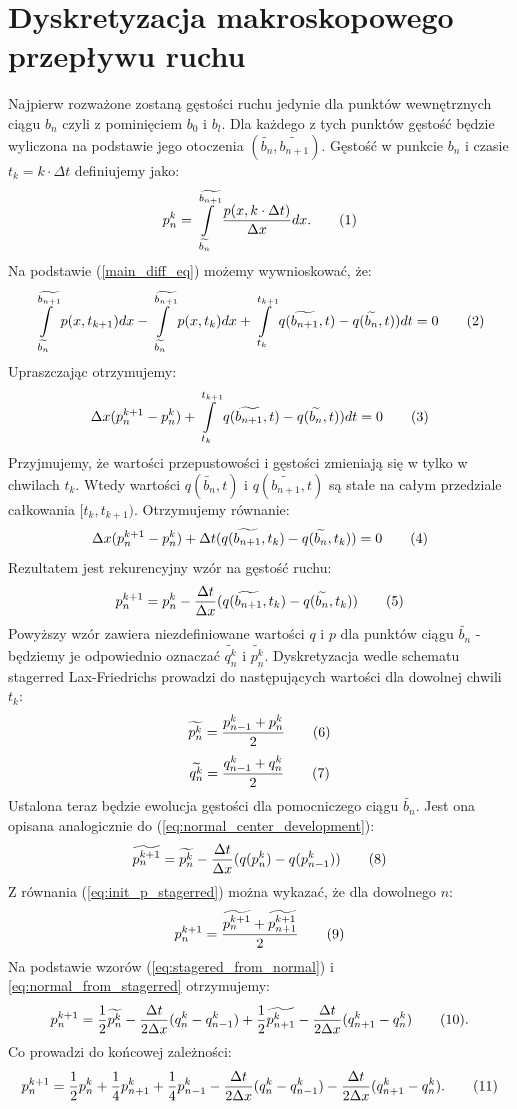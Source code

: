 \documentclass[12pt]{book}
\newcommand\addtag{\refstepcounter{equation}\tag{\theequation}}
\begin{document}
\section{Dyskretyzacja makroskopowego przepływu ruchu}\label{sec:dyskretyzacja_ruchu}
Najpierw rozważone zostaną gęstości ruchu jedynie dla punktów wewnętrznych ciągu $b_n$ czyli z pominięciem $b_0$ i $b_l$.
Dla każdego z tych punktów gęstość będzie wyliczona na podstawie jego otoczenia $(\widetilde{b_{n}},\widetilde{b_{n+1}})$. Gęstość w punkcie $b_n$ i czasie $t_k=k\cdot \Delta t$ definiujemy jako:
\[p_{n}^{k}=\int\limits_{{\widetilde{b_{n}}}}^{{\widetilde{b_{n+1}}}} {\frac{p(x,k \cdot \Delta t)}{\Delta x}dx}. \addtag\]
 Na podstawie (\ref{main_diff_eq}) możemy wywnioskować, że:
\[\int\limits_{\widetilde{b_{n}}}^{\widetilde{b_{n+1}}} {p(x,t_{k+1})dx-\int\limits_{\widetilde{b_{n}}}^{\widetilde{b_{n+1}}}p(x,t_{k})dx} +\int\limits_{t_k}^{t_{k+1}} q(\widetilde{b_{n+1}},t)-q(\widetilde{b_{n}},t))dt=0 \addtag \label{eq:calki-LWR} \]
Upraszczając otrzymujemy:
\[\Delta x(p_n^{k+1}-p_n^{k}) +\int\limits_{t_k}^{t_{k+1}} q(\widetilde{b_{n+1}},t)-q(\widetilde{b_{n}},t))dt=0 \addtag \]
Przyjmujemy, że wartości przepustowości i gęstości zmieniają się w tylko w chwilach $t_k$. Wtedy wartości $q(\widetilde{b_n},t)$ i $q(\widetilde{b_{n+1}},t)$ są stałe na całym przedziale całkowania $[t_k,t_{k+1})$. Otrzymujemy równanie:
\[\Delta x(p_n^{k+1}-p_n^{k})  + \Delta t (q(\widetilde{b_{n+1}},t_k)-q(\widetilde{b_{n}},t_k))=0 \addtag \]
Rezultatem jest rekurencyjny wzór na gęstość ruchu:
\[p^{k+1}_n=p^{k}_n -\frac{\Delta t}{\Delta x} (q(\widetilde{b_{n+1}},t_k)-q(\widetilde{b_{n}},t_k)) \addtag \label{eq:normal_center_development} \]  
Powyższy wzór zawiera niezdefiniowane wartości $q$ i $p$ dla punktów ciągu $\widetilde{b_n}$ - będziemy je odpowiednio oznaczać $\widetilde{q_{n}^k}$ i $\widetilde{p_{n}^k}$. Dyskretyzacja wedle schematu stagerred Lax-Friedrichs \cite{gottlich} prowadzi do następujących wartości dla dowolnej chwili $t_k$:
\[ 
\widetilde{p_n^k} =  \frac{p_{n-1}^k+p_{n}^k}{2} \addtag \label{eq:init_p_stagerred}
\]
\[ 
\widetilde{q_n^k} =  \frac{q_{n-1}^k+q_{n}^k}{2} \addtag
\]
Ustalona teraz będzie ewolucja gęstości dla pomocniczego ciągu $\widetilde{b_n}$. Jest ona opisana analogicznie do (\ref{eq:normal_center_development}):
\[\widetilde{p^{k+1}_n}=\widetilde{p^k_n}- \frac{\Delta t}{\Delta x}(q(p^k_{n})-q(p^k_{n-1})) \addtag \label{eq:stagered_from_normal} \]
Z równania (\ref{eq:init_p_stagerred}) można wykazać, że dla dowolnego $n$:
\[p_n^{k+1}=\frac{\widetilde{p_{n}^{k+1}}+\widetilde{p_{n+1}^{k+1}}}{2} \addtag
\label{eq:normal_from_stagerred} \]
Na podstawie wzorów (\ref{eq:stagered_from_normal}) i \eqref{eq:normal_from_stagerred} otrzymujemy:
\[ p_n^{k+1} =\frac{1}{2}\widetilde{p^{k}_n}-\frac{\Delta t}{2\Delta x}(q^k_n-q^k_{n-1})+\frac{1}{2}\widetilde{p^{k}_{n+1}}-\frac{\Delta t}{2\Delta x}(q^k_{n+1}-q^k_{n})  \addtag .\]
Co prowadzi do końcowej zależności:
\[ p_n^{k+1} =\frac{1}{2}p_n^k+\frac{1}{4}p_{n+1}^k+\frac{1}{4}p_{n-1}^k  -\frac{\Delta t}{2\Delta x}(q^k_n-q^k_{n-1})-\frac{\Delta t}{2\Delta x}(q^k_{n+1}-q^k_{n}).  \addtag \]
\end{document}
